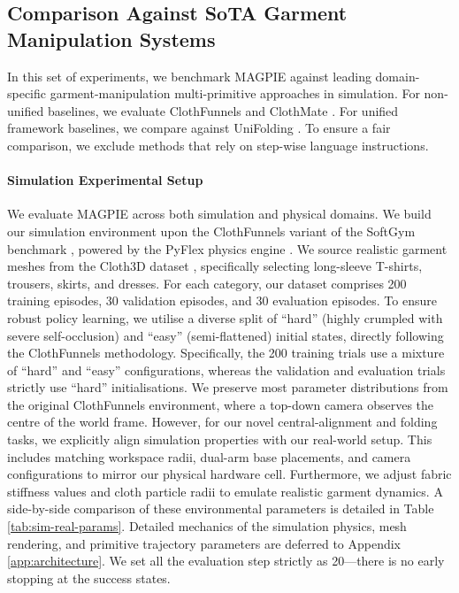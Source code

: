 \documentclass[journal]{IEEEtran}
\begin{document}
\subsection{Comparison Against SoTA Garment Manipulation Systems}
\label{sec:exp_sota}

In this set of experiments, we benchmark MAGPIE against leading domain-specific garment-manipulation multi-primitive approaches in simulation. For non-unified baselines, we evaluate ClothFunnels \cite{canberk2022cloth} and ClothMate \cite{luo2025clothmate}. For unified framework baselines, we compare against UniFolding \cite{xue2023unifolding}. To ensure a fair comparison, we exclude methods that rely on step-wise language instructions.

\paragraph{Simulation Experimental Setup}
We evaluate MAGPIE across both simulation and physical domains. We build our simulation environment upon the ClothFunnels variant of the SoftGym benchmark \cite{lin2020softgym}, powered by the PyFlex physics engine \cite{li2018learning}. We source realistic garment meshes from the Cloth3D dataset \cite{bertiche2020cloth3d}, specifically selecting long-sleeve T-shirts, trousers, skirts, and dresses. For each category, our dataset comprises 200 training episodes, 30 validation episodes, and 30 evaluation episodes. To ensure robust policy learning, we utilise a diverse split of ``hard'' (highly crumpled with severe self-occlusion) and ``easy'' (semi-flattened) initial states, directly following the ClothFunnels methodology. Specifically, the 200 training trials use a mixture of ``hard'' and ``easy'' configurations, whereas the validation and evaluation trials strictly use ``hard'' initialisations.  We preserve most parameter distributions from the original ClothFunnels environment, where a top-down camera observes the centre of the world frame. However, for our novel central-alignment and folding tasks, we explicitly align simulation properties with our real-world setup. This includes matching workspace radii, dual-arm base placements, and camera configurations to mirror our physical hardware cell. Furthermore, we adjust fabric stiffness values and cloth particle radii to emulate realistic garment dynamics. A side-by-side comparison of these environmental parameters is detailed in Table \ref{tab:sim-real-params}. Detailed mechanics of the simulation physics, mesh rendering, and primitive trajectory parameters are deferred to Appendix \ref{app:architecture}. We set all the evaluation step strictly as 20---there is no early stopping at the success states.
\end{document}
